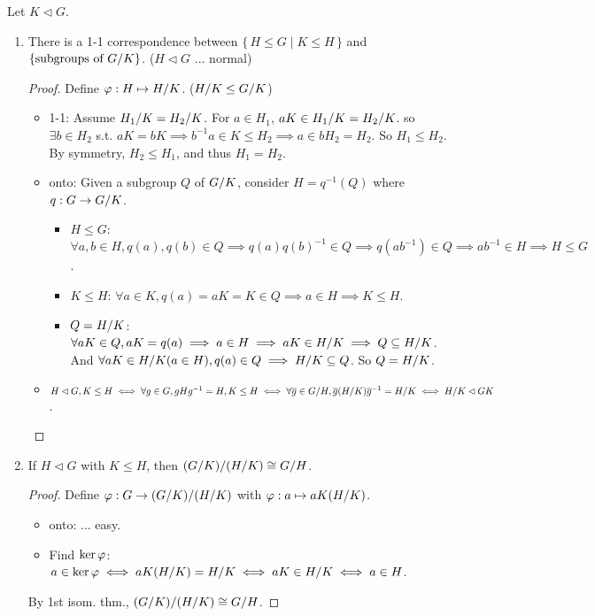 \begin{theorem}
  Let $K \lhd G$.
  \begin{enumerate}
    \item There is a 1-1 correspondence between $\{\, H \le G \mid K \le H \,\}$
      and $\{ \text{subgroups of ${G}/{K}$} \}$. ($H \lhd G$ ... normal)
      \begin{proof}
        Define $\varphi: H \mapsto {H}/{K}$. (${H}/{K} \le {G}/{K}$)
        \begin{itemize}
          \item 1-1: Assume ${H_1}/{K} = {H_2}/{K}$.
            For $a \in H_1$, $aK \in {H_1}/{K} = {H_2}/{K}$.
            so $\exists b \in H_2$ s.t. $aK = bK \implies b^{-1}a \in K \le H_2
            \implies a \in b H_2 = H_2$. So $H_1 \le H_2$. By symmetry,
            $H_2 \le H_1$, and thus $H_1 = H_2$.
          \item onto: Given a subgroup $Q$ of ${G}/{K}$, consider
            $H = q^{-1}(Q)$ where $q: G\to {G}/{K}$.
            \begin{itemize}
              \item $H \le G$: $\forall a, b \in H, q(a), q(b) \in Q \implies
                q(a)q(b)^{-1} \in Q \implies q(ab^{-1}) \in Q \implies
                ab^{-1} \in H \implies H \le G$.
              \item $K \le H$: $\forall a \in K, q(a) = aK = K \in Q \implies
                a \in H \implies K \le H$.
              \item $Q = {H}/{K}$: $\forall aK \in Q, aK = q(a) \implies
                a \in H \implies aK \in {H}/{K} \implies
                Q \subseteq {H}/{K}$.
                And $\forall aK \in {H}/{K} (a \in H), q(a) \in Q \implies
                  {H}/{K} \subseteq Q$. So $Q = {H}/{K}$.
            \end{itemize}
          \item $H \lhd G, K \le H \iff \forall g\in G, gHg^{-1} = H, K \le H
            \iff \forall \overline{g} \in {G}/{H}, \overline{g}({H}/{K})\overline{g}^{-1}
            = {H}/{K} \iff {H}/{K} \lhd {G}{K}$. \qedhere
        \end{itemize}
      \end{proof}
    \item If $H \lhd G$ with $K \le H$, then ${({G}/{K})}/{({H}/{K})}
      \cong {G}/{H}$.
      \begin{proof}
        Define $\varphi: G \to{({G}/{K})}/{({H}/{K})}$ with
        $\varphi: a \mapsto aK({H}/{K})$.
        \begin{itemize}
          \item onto: ... easy.
          \item Find $\operatorname{ker} \varphi$: $a \in \operatorname{ker} \varphi \iff aK({H}/{K})
            = {H}/{K} \iff aK \in {H}/{K} \iff a \in H$.
        \end{itemize}
        By 1st isom. thm., ${({G}/{K})}/{({H}/{K})} \cong
        {G}/{H}$.
      \end{proof}
  \end{enumerate}
\end{theorem}

